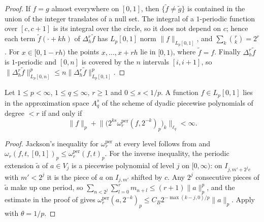 \begin{proof}
\leanok
If $f = g$ almost everywhere on $[0, 1]$, then $\{\tilde f \neq \tilde g\}$ is contained in the
union of the integer translates of a null set. The integral of a $1$-periodic function over
$[c, c + 1]$ is its integral over the circle, so it does not depend on $c$; hence each term
$\tilde f(\cdot + kh)$ of $\Delta_h^r \tilde f$ has $L_p[0,1]$ norm $\|f\|_{L_p[0,1]}$, and
$\sum_k \binom{r}{k} = 2^r$. For $x \in [0, 1 - rh)$ the points $x, \dots, x + rh$ lie in
$[0, 1)$, where $\tilde f = f$. Finally $\Delta_h^r \tilde f$ is $1$-periodic and $[0, n]$ is
covered by the $n$ intervals $[i, i + 1]$, so
$\|\Delta_h^r \tilde f\|_{L_p[0, n]}^p \leq n \|\Delta_h^r \tilde f\|_{L_p[0, 1]}^p$.
\end{proof}

\begin{theorem}
\label{thm:pp-besov-per}
\leanok
{}
Let $1 \leq p < \infty$, $1 \leq q \leq \infty$, $r \geq 1$ and $0 \leq s < 1/p$. A function
$f \in L_p[0,1]$ lies in the approximation space $A^s_q$ of the scheme of dyadic piecewise
polynomials of degree $< r$ if and only if
\[
  \|f\|_p + \bigl\| \bigl( 2^{ks} \omega_r^{\mathrm{per}}(f, 2^{-k})_p \bigr)_k \bigr\|_{\ell_q}
  < \infty .
\]
\end{theorem}

\begin{proof}
\leanok
Jackson's inequality for $\omega_r^{\mathrm{per}}$ at every level follows from
 and $\omega_r(f, t, [0,1])_p \leq \omega_r^{\mathrm{per}}(f, t)_p$. For the inverse inequality, the
periodic extension $\tilde a$ of $a \in V_j$ is a piecewise polynomial of level $j$ on
$[0, \infty)$: on $I_{j, m' + 2^j c}$ with $m' < 2^j$ it is the piece of $a$ on $I_{j, m'}$
shifted by $c$. Any $2^j$ consecutive pieces of $\tilde a$ make up one period, so
$\sum_{n < 2^j} \sum_{l = 0}^r m_{n+l} \leq (r + 1) \|a\|_p^p$, and the estimate in the proof of
 gives
$\omega_r^{\mathrm{per}}(a, 2^{-k})_p \leq C_B 2^{-\max(k-j, 0)/p} \|a\|_p$. Apply
 with $\theta = 1/p$.
\end{proof}

